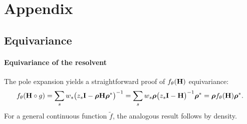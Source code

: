 \documentclass{article} \usepackage{iclr2024_conference,times}
\begin{document}



\clearpage
\appendix
\section{Appendix}
\subsection{Equivariance}
\label{sec:equivariant-op}





\paragraph{Equivariance of the resolvent}
The pole expansion yields a straightforward proof  of $f_\theta({\bf H})$ equivariance:  
\begin{equation}
\begin{split}
    f_\theta({\bf H} \circ g) 
    = \sum_s w_s \big( z_s {\bf I} - {\bm \rho} {\bf H} {\bm \rho}^* \big)^{-1} 
    = \sum_s w_s {\bm \rho} \big( z_s {\bf I} -  {\bf H}  \big)^{-1} {\bm \rho}^* 
    = {\bm \rho} f_\theta({\bf H}) {\bm \rho}^*.
\end{split}    
\end{equation}
For a general continuous function $\tilde{f}$, the analogous result follows by density.
\end{document}
